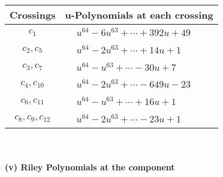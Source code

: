 \documentclass[1p]{elsarticle_modified}
\theoremstyle{definition}
\begin{document}
\begin{tabular}{m{50pt}|m{274pt}}
Crossings & \hspace{64pt}u-Polynomials at each crossing \\
\hline $$\begin{aligned}c_{1}\end{aligned}$$&$\begin{aligned}
&u^{64}-6 u^{63}+\cdots+392 u+49
\end{aligned}$\\
\hline $$\begin{aligned}c_{2},c_{5}\end{aligned}$$&$\begin{aligned}
&u^{64}-2 u^{63}+\cdots+14 u+1
\end{aligned}$\\
\hline $$\begin{aligned}c_{3},c_{7}\end{aligned}$$&$\begin{aligned}
&u^{64}- u^{63}+\cdots-30 u+7
\end{aligned}$\\
\hline $$\begin{aligned}c_{4},c_{10}\end{aligned}$$&$\begin{aligned}
&u^{64}-2 u^{63}+\cdots-649 u-23
\end{aligned}$\\
\hline $$\begin{aligned}c_{6},c_{11}\end{aligned}$$&$\begin{aligned}
&u^{64}- u^{63}+\cdots+16 u+1
\end{aligned}$\\
\hline $$\begin{aligned}c_{8},c_{9},c_{12}\end{aligned}$$&$\begin{aligned}
&u^{64}-2 u^{63}+\cdots-23 u+1
\end{aligned}$\\
\hline
\end{tabular}\\~\\
\newpage\renewcommand{\arraystretch}{1}
\flushleft \textbf{(v) Riley Polynomials at the component}\newline \\
\end{document}
